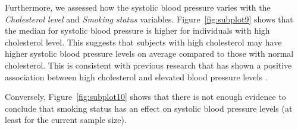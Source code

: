 \documentclass[12 pt]{scrartcl}
\numberwithin{equation}{section}
\begin{document}
Furthermore, we assessed how the systolic blood pressure varies with the \textit{Cholesterol level} and \textit{Smoking status} variables.
Figure~\ref{fig:subplot9} shows that the median for systolic blood pressure is higher for individuals with high cholesterol level.
This suggests that subjects with high cholesterol may have higher systolic blood pressure levels on average 
compared to those with normal cholesterol. 
This is consistent with previous research that has shown a positive association between high cholesterol and elevated blood 
pressure levels \citep{sakurai2011relationship}.

Conversely, Figure~\ref{fig:subplot10} shows that there is not enough evidence to conclude that
smoking status has an effect on systolic blood pressure levels (at least for the current sample size).
\end{document}
